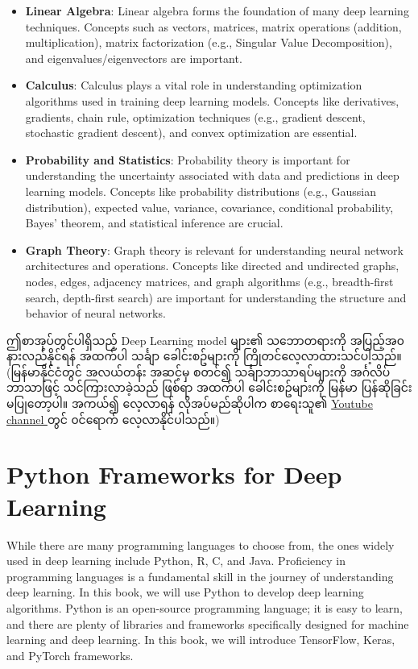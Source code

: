 \begin{itemize}
  \item \textbf{Linear Algebra}: Linear algebra forms the foundation of many deep learning techniques. Concepts such as vectors, matrices, matrix operations (addition, multiplication), matrix factorization (e.g., Singular Value Decomposition), and eigenvalues/eigenvectors are important.
  \item \textbf{Calculus}: Calculus plays a vital role in understanding optimization algorithms used in training deep learning models. Concepts like derivatives, gradients, chain rule, optimization techniques (e.g., gradient descent, stochastic gradient descent), and convex optimization are essential.
  \item \textbf{Probability and Statistics}: Probability theory is important for understanding the uncertainty associated with data and predictions in deep learning models. Concepts like probability distributions (e.g., Gaussian distribution), expected value, variance, covariance, conditional probability, Bayes' theorem, and statistical inference are crucial.
  \item \textbf{Graph Theory}: Graph theory is relevant for understanding neural network architectures and operations. Concepts like directed and undirected graphs, nodes, edges, adjacency matrices, and graph algorithms (e.g., breadth-first search, depth-first search) are important for understanding the structure and behavior of neural networks.
\end{itemize}

ဤစာအုပ်တွင်ပါရှိသည့် Deep Learning model များ၏ သဘောတရားကို အပြည့်အ၀ နားလည်နိုင်ရန် အထက်ပါ သင်္ချာ ခေါင်းစဥ်များကို ကြိုတင်လေ့လာထားသင်ပါ့သည်။ (မြန်မာနိုင်ငံတွင် အလယ်တန်း အဆင့်မှ စတင်၍ သင်္ချာဘာသာရပ်များကို အင်္ဂလိပ်ဘာသာဖြင့် သင်ကြားလာခဲ့သည် ဖြစ်ရာ အထက်ပါ ခေါင်းစဥ်များကို မြန်မာ ပြန်ဆိုခြင်း မပြုတော့ပါ။ အကယ်၍ လေ့လာရန် လိုအပ်မည်ဆိုပါက စာရေးသူ၏ \href{https://www.youtube.com/@drmyothida}{ Youtube channel } တွင် ၀င်ရောက် လေ့လာနိုင်ပါသည်။)


\section{Python Frameworks for Deep Learning}\label{sec:python}

While there are many programming languages to choose from, the ones widely used in deep learning include Python, R, C, and Java. Proficiency in programming languages is a fundamental skill in the journey of understanding deep learning. In this book, we will use Python \cite{web:python} to develop deep learning algorithms. Python is an open-source programming language; it is easy to learn, and there are plenty of libraries and frameworks specifically designed for machine learning and deep learning. In this book, we will introduce TensorFlow, Keras, and PyTorch frameworks.

